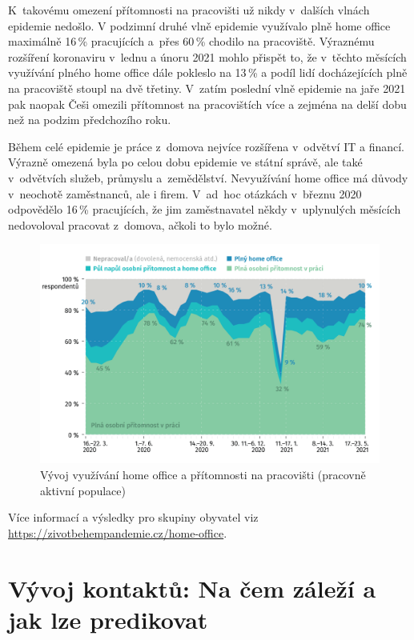 K takovému omezení přítomnosti na pracovišti už nikdy v dalších vlnách epidemie nedošlo. V podzimní druhé vlně epidemie využívalo plně home office maximálně 16\,\% pracujících a přes 60\,\% chodilo na pracoviště. Výraznému rozšíření koronaviru v lednu a únoru 2021 mohlo přispět to, že v těchto měsících využívání plného home office dále pokleslo na 13\,\% a podíl lidí docházejících plně na pracoviště stoupl na dvě třetiny. V zatím poslední vlně epidemie na jaře 2021 pak naopak Češi omezili přítomnost na pracovištích více a zejména na delší dobu než na podzim předchozího roku.

Během celé epidemie je práce z domova nejvíce rozšířena v odvětví IT a financí. Výrazně omezená byla po celou dobu epidemie ve státní správě, ale také v odvětvích služeb, průmyslu a zemědělství. Nevyužívání home office má důvody v neochotě zaměstnanců, ale i firem. V ad hoc otázkách v březnu 2020 odpovědělo 16\,\% pracujících, že jim zaměstnavatel někdy v uplynulých měsících nedovoloval pracovat z domova, ačkoli to bylo možné.

\begin{figure}[ht]
    \centering
    \includegraphics[width=\textwidth]{./pic/zbp-graf4.png}
    \caption{Vývoj využívání home office a přítomnosti na pracovišti (pracovně aktivní populace)}
    \label{fig:zbp4}
\end{figure}

Více informací a výsledky pro skupiny obyvatel viz \url{https://zivotbehempandemie.cz/home-office}.

\section*{Vývoj kontaktů: Na čem záleží a jak lze predikovat}

